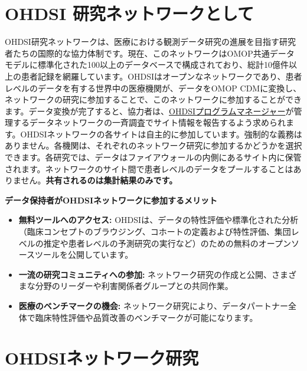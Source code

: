 \documentclass[
  11pt]{book}
\makeatletter
\providecommand{\tightlist}{%
  \setlength{\itemsep}{0pt}\setlength{\parskip}{0pt}}
\newenvironment{kframe}{%
\medskip{}
\setlength{\fboxsep}{.8em}
 \def\at@end@of@kframe{}%
 \ifinner\ifhmode%
  \def\at@end@of@kframe{\end{minipage}}%
  \begin{minipage}{\columnwidth}%
 \fi\fi%
 \def\FrameCommand##1{\hskip\@totalleftmargin \hskip-\fboxsep
 \colorbox{myShadeColor}{##1}\hskip-\fboxsep
     \hskip-\linewidth \hskip-\@totalleftmargin \hskip\columnwidth}%
 \MakeFramed {\advance\hsize-\width
   \@totalleftmargin\z@ \linewidth\hsize
   \@setminipage}}%
 {\par\unskip\endMakeFramed%
 \at@end@of@kframe}
\newenvironment{rmdblock}[1]
  {
  \begin{itemize}
  \renewcommand{\labelitemi}{
    \raisebox{-.7\height}[0pt][0pt]{
      {\setkeys{Gin}{width=3em,keepaspectratio}\texttt{[image: images/\#1]}}
    }
  }
  \setlength{\fboxsep}{1em}
  \begin{kframe}
  \item
  }
  {
  \end{kframe}
  \end{itemize}
  }
\newenvironment{rmdimportant}
  {\begin{rmdblock}{important}}
  {\end{rmdblock}}
\theoremstyle{definition}
\theoremstyle{definition}
\theoremstyle{definition}
\theoremstyle{definition}
\theoremstyle{remark}
\makeatother
\begin{document}
\section{OHDSI 研究ネットワークとして}\label{ohdsi-ux7814ux7a76ux30cdux30c3ux30c8ux30efux30fcux30afux3068ux3057ux3066}


OHDSI研究ネットワークは、医療における観測データ研究の進展を目指す研究者たちの国際的な協力体制です。現在、このネットワークはOMOP共通データモデルに標準化された100以上のデータベースで構成されており、総計10億件以上の患者記録を網羅しています。OHDSIはオープンなネットワークであり、患者レベルのデータを有する世界中の医療機関が、データをOMOP CDMに変換し、ネットワークの研究に参加することで、このネットワークに参加することができます。データ変換が完了すると、協力者は、\href{mailto:contact@ohdsi.org}{OHDSIプログラムマネージャー}が管理するデータネットワークの一斉調査でサイト情報を報告するよう求められます。OHDSIネットワークの各サイトは自主的に参加しています。強制的な義務はありません。各機関は、それぞれのネットワーク研究に参加するかどうかを選択できます。各研究では、データはファイアウォールの内側にあるサイト内に保管されます。ネットワークのサイト間で患者レベルのデータをプールすることはありません。\textbf{共有されるのは集計結果のみです。}

\begin{rmdimportant}
\textbf{データ保持者がOHDSIネットワークに参加するメリット}

\begin{itemize}
\tightlist
\item
  \textbf{無料ツールへのアクセス:} OHDSIは、データの特性評価や標準化された分析（臨床コンセプトのブラウジング、コホートの定義および特性評価、集団レベルの推定や患者レベルの予測研究の実行など）のための無料のオープンソースツールを公開しています。
\item
  \textbf{一流の研究コミュニティへの参加:} ネットワーク研究の作成と公開、さまざまな分野のリーダーや利害関係者グループとの共同作業。
\item
  \textbf{医療のベンチマークの機会:} ネットワーク研究により、データパートナー全体で臨床特性評価や品質改善のベンチマークが可能になります。
\end{itemize}
\end{rmdimportant}

\section{OHDSIネットワーク研究}\label{ohdsiux30cdux30c3ux30c8ux30efux30fcux30afux7814ux7a76}
\end{document}
